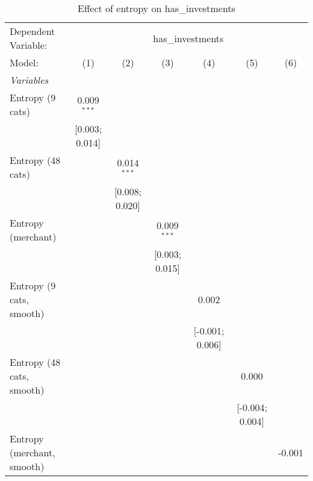
\begin{table}[htbp]
   \centering
   \tiny
   \begin{threeparttable}[b]
      \caption{\label{tab:reg_has_investments} Effect of entropy on has\_investments}
      \begin{tabular}{lcccccc}
         \tabularnewline \midrule \midrule
         Dependent Variable: & \multicolumn{6}{c}{has\_investments}\\
         Model:                     & (1)             & (2)             & (3)             & (4)             & (5)             & (6)\\  
         \midrule
         \emph{Variables}\\
         Entropy (9 cats)           & 0.009$^{***}$   &                 &                 &                 &                 &   \\   
                                    & [0.003; 0.014]  &                 &                 &                 &                 &   \\   
         Entropy (48 cats)          &                 & 0.014$^{***}$   &                 &                 &                 &   \\   
                                    &                 & [0.008; 0.020]  &                 &                 &                 &   \\   
         Entropy (merchant)         &                 &                 & 0.009$^{***}$   &                 &                 &   \\   
                                    &                 &                 & [0.003; 0.015]  &                 &                 &   \\   
         Entropy (9 cats, smooth)   &                 &                 &                 & 0.002           &                 &   \\   
                                    &                 &                 &                 & [-0.001; 0.006] &                 &   \\   
         Entropy (48 cats, smooth)  &                 &                 &                 &                 & 0.000           &   \\   
                                    &                 &                 &                 &                 & [-0.004; 0.004] &   \\   
         Entropy (merchant, smooth) &                 &                 &                 &                 &                 & -0.001\\   

\end{tabular}
\end{threeparttable}
\end{table}
